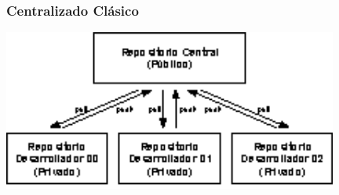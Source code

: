 \documentclass[handout,a4paper,slidestop,dvips,xcolor=pst,blue]{beamer}
\begin{document}
\begin{frame}[c]
	\frametitle{Centralizado Clásico}
    \begin{center}
        \includegraphics[width=11cm,keepaspectratio=true]{images/git/esquemaCentralizado.eps}
    \end{center}
\end{frame}
\end{document}
